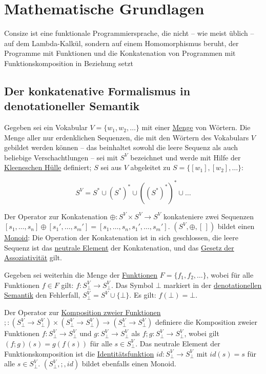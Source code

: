\chapter{Mathematische Grundlagen}%

Consize ist eine funktionale Programmiersprache, die nicht -- wie meist üblich -- auf dem Lambda-Kalkül, sondern auf einem Homomorphismus beruht, der Programme mit Funktionen und die Konkatenation von Programmen mit Funktionskomposition in Beziehung setzt

\section{Der konkatenative Formalismus in denotationeller Semantik}

Gegeben sei ein Vokabular $V=\{w_1, w_2, \dots\}$ mit einer \href{http://de.wikipedia.org/wiki/Menge\_(Mathematik)}{Menge} von Wör\-tern. Die Menge aller nur erdenklichen Sequenzen, die mit den Wörtern des Vokabulars $V$ gebildet werden können -- das beinhaltet sowohl die leere Sequenz als auch beliebige Verschachtlungen -- sei mit $S^V$ bezeichnet und werde mit Hilfe der \href{http://de.wikipedia.org/wiki/Kleenesche_und_positive_H\%C3\%BClle}{Kleeneschen Hülle} definiert; $S$ sei aus $V$ abgeleitet zu $S=\{[w_1],[w_2],\dots\}$:

$$S^V=S^{\ast}\cup(S^{\ast})^{\ast}\cup((S^{\ast})^{\ast})^{\ast}\cup\dots$$

Der Operator zur Konkatenation $\oplus: S^V\times S^V \rightarrow S^V$ konkateniere zwei Sequenzen
$[s_1,\dots,s_n]\oplus[s_1',\dots,s_m']=[s_1,\dots,s_n,s_1',\dots,s_m']$. $(S^V,\oplus,[\,])$ bildet einen \href{http://de.wikipedia.org/wiki/Monoid}{Monoid}: Die Operation der Konkatenation ist in sich geschlossen, die leere Sequenz ist das \href{http://de.wikipedia.org/wiki/Neutrales\_Element}{neutrale Element} der Konkatenation, und das \href{http://de.wikipedia.org/wiki/Assoziativgesetz}{Gesetz der Assoziativität} gilt.

Gegeben sei weiterhin die Menge der \href{http://de.wikipedia.org/wiki/Funktion\_(Mathematik)}{Funktionen} $F=\{f_1, f_2, \dots\}$, wobei für alle Funktionen $f\in F$ gilt: $f:S^V_{\bot}\rightarrow S^V_{\bot}$. Das Symbol $\bot$ markiert in der \href{http://de.wikipedia.org/wiki/Denotationelle\_Semantik}{denotationellen Semantik} den Fehlerfall, $S^V_{\bot}=S^V\cup\{\bot\}$. Es gilt: $f(\bot)=\bot$.

Der Operator zur \href{http://de.wikipedia.org/wiki/Komposition\_(Mathematik)}{Komposition zweier Funktionen}
$;:(S^V_{\bot}\rightarrow S^V_{\bot}) \times
(S^V_{\bot}\rightarrow S^V_{\bot}) \rightarrow
(S^V_{\bot}\rightarrow S^V_{\bot})$ definiere die Komposition zweier Funktionen 
$f:S^V_{\bot}\rightarrow S^V_{\bot}$
und 
$g:S^V_{\bot}\rightarrow S^V_{\bot}$
als $f;g: S^V_{\bot}\rightarrow S^V_{\bot}$, wobei gilt
$(f;g)(s)=g(f(s))$ für alle $s\in S^V_{\bot}$. Das neutrale Element der Funktionskomposition ist die \href{http://de.wikipedia.org/wiki/Identische\_Abbildung}{Identitätsfunktion} $id:S^V_{\bot}\rightarrow S^V_{\bot}$ mit $id(s)=s$ für alle $s\in S^V_{\bot}$. $(S^V_{\bot},;,id)$ bildet ebenfalls einen Monoid.

